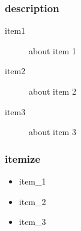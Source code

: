 \subsubsection{description}
\begin{description}
    \item [item1] about item 1 
    \item [item2] about item 2 
    \item [item3] about item 3
\end{description}

\subsubsection{itemize}
\begin{itemize} 
    \item item\_1 
    \item item\_2 
    \item item\_3 
\end{itemize}